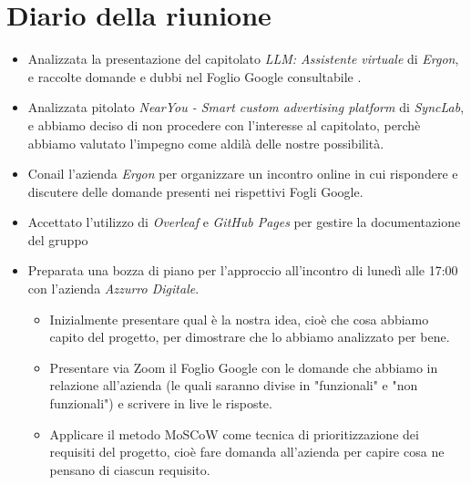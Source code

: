 \section{Diario della riunione}

\begin{itemize}
    \item Analizzata la presentazione del capitolato \emph{LLM: Assistente virtuale} di \emph{Ergon}, e raccolte domande e dubbi nel Foglio Google consultabile .
    
    \item Analizzata pitolato \emph{NearYou - Smart custom advertising platform} di \emph{SyncLab}, e abbiamo deciso di non procedere con l'interesse al capitolato, perchè abbiamo valutato l'impegno come aldilà delle nostre possibilità.
    
    \item Conail l'azienda \emph{Ergon} per organizzare un incontro online in cui rispondere e discutere delle domande presenti nei rispettivi Fogli Google.

    \item Accettato l'utilizzo di \emph{Overleaf} e \emph{GitHub Pages} per gestire la documentazione del gruppo

    \item Preparata una bozza di piano per l'approccio all'incontro di lunedì alle 17:00 con l'azienda \emph{Azzurro Digitale}. 
    \begin{itemize}
        \renewcommand{\labelitemii}{--}
        \item Inizialmente presentare qual è la nostra idea, cioè che cosa abbiamo capito del progetto, per dimostrare che lo abbiamo analizzato per bene.
        \item Presentare via Zoom il Foglio Google con le domande che abbiamo in relazione all'azienda (le quali saranno divise in "funzionali" e "non funzionali") e scrivere in live le risposte.
        \item Applicare il metodo MoSCoW come tecnica di prioritizzazione dei requisiti del progetto, cioè fare domanda all'azienda per capire cosa ne pensano di ciascun requisito.
    \end{itemize}
\end{itemize}